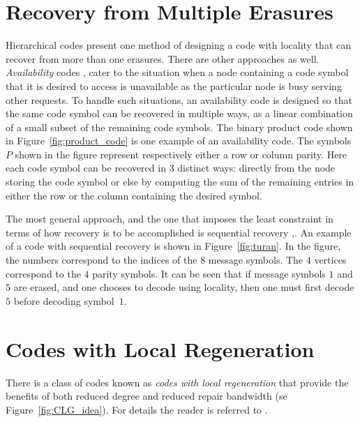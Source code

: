 \begin{multicols}{2}
\section{Recovery from Multiple Erasures} 

\vskip -3pt

Hierarchical codes present one method of designing a code with locality that can recover from more than one erasures.  There are other approaches as well.  {\em Availability} codes \cite{WanZha}, \cite{WanZhaLiu} cater to the situation when a node containing a code symbol that it is desired to access is unavailable as the particular node is busy serving other requests.  To handle such situations, an availability code is designed so that the same code symbol can be recovered in multiple ways, as a linear combination of a small subset of the remaining code symbols.  The binary product code shown in Figure~\ref{fig:product_code} is one example of an availability code.  The symbols $P$ shown in the figure represent respectively either a row or column parity. Here each code symbol can be recovered in $3$ distinct ways: directly from the node storing the code symbol or else by computing the sum of the remaining entries in either the row or the column containing the desired symbol.

The most general approach, and the one that imposes the least constraint in terms of how recovery is to be accomplished is sequential recovery \cite{PraLalKum} ,\cite{BalKinKum_ISIT}.  An example of a code with sequential recovery is shown in Figure~\ref{fig:turan}. In the figure, the numbers correspond to the indices of the $8$ message symbols.  The $4$ vertices correspond to the $4$ parity symbols.  It can be seen that if message symbols $1$ and $5$ are erased, and one chooses to decode using locality, then one must first decode $5$ before decoding symbol~$1$.\\[-15pt]

\section{Codes with Local Regeneration}

There is a class of codes known as {\em codes with local regeneration} that provide the benefits of both reduced degree and reduced repair bandwidth (se Figure~\ref{fig:CLG_idea}).  For details the reader is referred to \cite{KamPraLalKum,RawKoySilVis,KrishnanRK18}.\\[-15pt]


\end{multicols}
